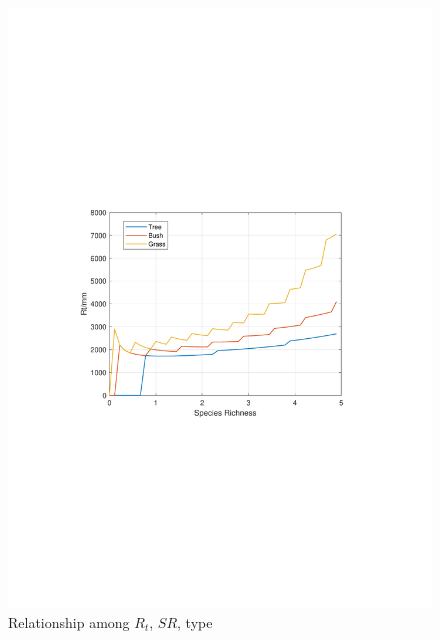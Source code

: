 \documentclass[12pt]{article}  %
\begin{document}
\begin{figure}[htbp]
	\centering
	\begin{minipage}[t]{0.45\textwidth}
		\centering
		\includegraphics[width=1\textwidth]{easymcm/img/Rt-D-type.pdf}
		\caption{Relationship among $R_t$, $SR$, type}
  \label{fig:type}
	\end{minipage}
	\begin{minipage}[t]{0.45\textwidth}
		\centering

\end{minipage}
\end{figure}
\end{document}
